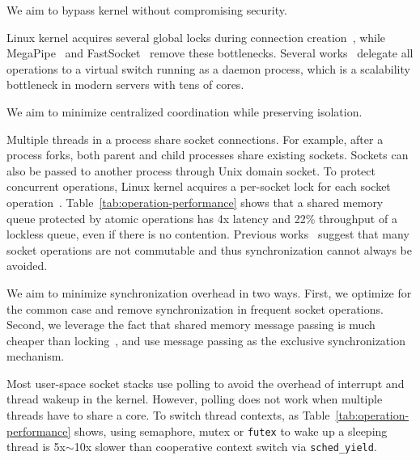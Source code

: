We aim to bypass kernel without compromising security.


Linux kernel acquires several global locks during connection creation~\cite{boyd2008corey,boyd2010analysis}, while MegaPipe~\cite{han2012megapipe} and FastSocket~\cite{lin2016scalable} remove these bottlenecks.
Several works~\cite{martins2014clickos,roghanchi2017ffwd,huang2017high,freeflow} delegate all operations to a virtual switch running as a daemon process, which is a scalability bottleneck in modern servers with tens of cores.

We aim to minimize centralized coordination while preserving isolation.

Multiple threads in a process share socket connections.
For example, after a process forks, both parent and child processes share existing sockets.
Sockets can also be passed to another process through Unix domain socket.
To protect concurrent operations, Linux kernel acquires a per-socket lock for each socket operation~\cite{boyd2010analysis,han2012megapipe,lin2016scalable}.
Table~\ref{tab:operation-performance} shows that a shared memory queue protected by atomic operations has 4x latency and 22\% throughput of a lockless queue, even if there is no contention.
Previous works~\cite{boyd2010analysis,clements2015scalable} suggest that many socket operations are not commutable and thus synchronization cannot always be avoided.

We aim to minimize synchronization overhead in two ways.
First, we optimize for the common case and remove synchronization in frequent socket operations.
Second, we leverage the fact that shared memory message passing is much cheaper than locking~\cite{roghanchi2017ffwd}, and use message passing as the exclusive synchronization mechanism.


Most user-space socket stacks use polling to avoid the overhead of interrupt and thread wakeup in the kernel.
However, polling does not work when multiple threads have to share a core.
To switch thread contexts, as Table~\ref{tab:operation-performance} shows, using semaphore, mutex or \texttt{futex} to wake up a sleeping thread is 5x$\sim$10x slower than cooperative context switch via \texttt{sched\_yield}.

